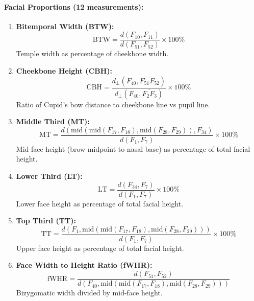 \paragraph{Facial Proportions (12 measurements):}
\begin{enumerate}[resume]
    \item \textbf{Bitemporal Width (BTW):}
    \begin{equation}
    \text{BTW} = \frac{d(F_{10}, F_{11})}{d(F_{51}, F_{52})} \times 100\%
    \end{equation}
    Temple width as percentage of cheekbone width.
    
    \item \textbf{Cheekbone Height (CBH):}
    \begin{equation}
    \text{CBH} = \frac{d_\perp(F_{40}, \overline{F_{51}F_{52}})}{d_\perp(F_{40}, \overline{F_2F_3})} \times 100\%
    \end{equation}
    Ratio of Cupid's bow distance to cheekbone line vs pupil line.
    
    \item \textbf{Middle Third (MT):}
    \begin{equation}
    \text{MT} = \frac{d\left(\text{mid}(\text{mid}(F_{17}, F_{18}), \text{mid}(F_{28}, F_{29})), F_{34}\right)}{d(F_1, F_7)} \times 100\%
    \end{equation}
    Mid-face height (brow midpoint to nasal base) as percentage of total facial height.
    
    \item \textbf{Lower Third (LT):}
    \begin{equation}
    \text{LT} = \frac{d(F_{34}, F_7)}{d(F_1, F_7)} \times 100\%
    \end{equation}
    Lower face height as percentage of total facial height.
    
    \item \textbf{Top Third (TT):}
    \begin{equation}
    \text{TT} = \frac{d\left(F_1, \text{mid}(\text{mid}(F_{17}, F_{18}), \text{mid}(F_{28}, F_{29}))\right)}{d(F_1, F_7)} \times 100\%
    \end{equation}
    Upper face height as percentage of total facial height.
    
    \item \textbf{Face Width to Height Ratio (fWHR):}
    \begin{equation}
    \text{fWHR} = \frac{d(F_{51}, F_{52})}{d\left(F_{40}, \text{mid}(\text{mid}(F_{17}, F_{18}), \text{mid}(F_{28}, F_{29}))\right)}
    \end{equation}
    Bizygomatic width divided by mid-face height.
    

\end{enumerate}
